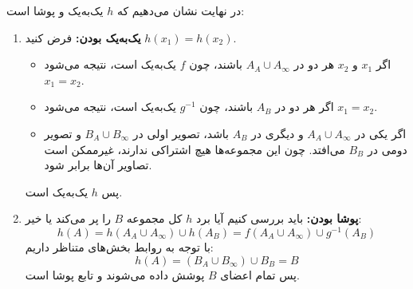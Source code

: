 در نهایت نشان می‌دهیم که $h$ یک‌به‌یک و پوشا است:

\begin{enumerate}
    \item \textbf{یک‌به‌یک بودن:} 
    فرض کنید $h(x_1) = h(x_2)$. 
    \begin{itemize}
        \item اگر $x_1$ و $x_2$ هر دو در $A_A \cup A_\infty$ باشند، چون $f$ یک‌به‌یک است، نتیجه می‌شود $x_1 = x_2$.
        \item اگر هر دو در $A_B$ باشند، چون $g^{-1}$ یک‌به‌یک است، نتیجه می‌شود $x_1 = x_2$.
        \item اگر یکی در $A_A \cup A_\infty$ و دیگری در $A_B$ باشد، تصویر اولی در $B_A \cup B_\infty$ و تصویر دومی در $B_B$ می‌افتد. چون این مجموعه‌ها هیچ اشتراکی ندارند، غیرممکن است تصاویر آن‌ها برابر شود.
    \end{itemize}
    پس $h$ یک‌به‌یک است.

    \item \textbf{پوشا بودن:} 
    باید بررسی کنیم آیا برد $h$ کل مجموعه $B$ را پر می‌کند یا خیر:
    \[
    h(A) = h(A_A \cup A_\infty) \cup h(A_B) = f(A_A \cup A_\infty) \cup g^{-1}(A_B)
    \]
    با توجه به روابط بخش‌های متناظر داریم:
    \[
    h(A) = (B_A \cup B_\infty) \cup B_B = B
    \]
    پس تمام اعضای $B$ پوشش داده می‌شوند و تابع پوشا است.
\end{enumerate}

